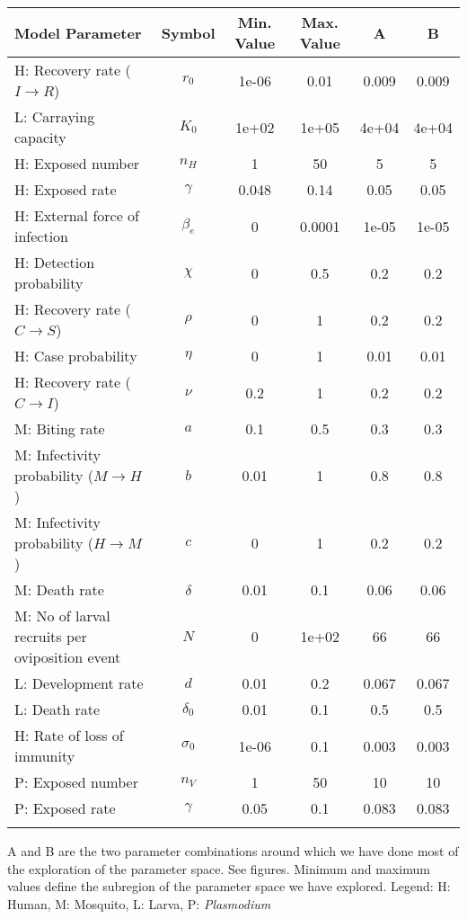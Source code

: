 \begin{table}
\noindent
\begin{tabular}{p{5cm}ccccc}
{\bf Model Parameter} & {\bf Symbol} & {\bf Min. Value} & {\bf Max. Value} & {\bf A} & {\bf B}\\
\hline\hline
  H: Recovery rate ($I \rightarrow R$) & $r_0$ & 1e-06 & 0.01 & 0.009 & 0.009\\
  L: Carraying capacity & $K_0$ & 1e+02 & 1e+05 & 4e+04 & 4e+04\\
  H: Exposed number & $n_H$ &    1 &   50 &    5 &    5\\
  H: Exposed rate & $\gamma$ & 0.048 & 0.14 & 0.05 & 0.05\\
  H: External force of infection & $\beta_e$ &    0 & 0.0001 & 1e-05 & 1e-05\\
  H: Detection probability & $\chi$ &    0 &  0.5 &  0.2 &  0.2\\
  H: Recovery rate ($C \rightarrow S$) & $\rho$ &    0 &    1 &  0.2 &  0.2\\
  H: Case probability & $\eta$ &    0 &    1 & 0.01 & 0.01\\
  H: Recovery rate ($C \rightarrow I$) & $\nu$ &  0.2 &    1 &  0.2 &  0.2\\
  M: Biting rate & $a$ &  0.1 &  0.5 &  0.3 &  0.3\\
  M: Infectivity probability ($M \rightarrow H$) & $b$ & 0.01 &    1 &  0.8 &  0.8\\
  M: Infectivity probability ($H \rightarrow M$) & $c$ &    0 &    1 &  0.2 &  0.2\\
  M: Death rate & $\delta$ & 0.01 &  0.1 & 0.06 & 0.06\\
  M: No of larval recruits per oviposition event & $N$ &    0 & 1e+02 &   66 &   66\\
  L: Development rate & $d$ & 0.01 &  0.2 & 0.067 & 0.067\\
  L: Death rate & $\delta_0$ & 0.01 &  0.1 &  0.5 &  0.5\\
  H: Rate of loss of immunity & $\sigma_0$ & 1e-06 &  0.1 & 0.003 & 0.003\\
  P: Exposed number & $n_V$ &    1 &   50 &   10 &   10\\
  P: Exposed rate & $\gamma$ & 0.05 &  0.1 & 0.083 & 0.083\\
\hline\hline
\smallskip
\end{tabular}
 A and B are the two parameter combinations around which we have done most of the exploration of the parameter space. See figures. Minimum and maximum values define the subregion of the parameter space we have explored. Legend: {\small H: Human, M: Mosquito, L: Larva, P: {\em Plasmodium}} 
\end{table}
